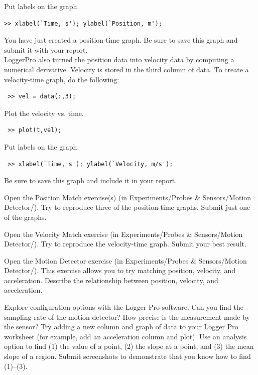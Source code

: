 \documentclass[11pt,letterpaper]{article}
\newcounter{question}[section]
\begin{document}
Put labels on the graph.
\begin{verbatim}>> xlabel(`Time, s'); ylabel(`Position, m');
\end{verbatim}

You have just created a position-time graph. Be sure to save this graph and submit it with your report.\\


LoggerPro also turned the position data into velocity data by computing a numerical derivative. Velocity is stored in the third column of data. To create a velocity-time graph, do the following:

\begin{verbatim} >> vel = data(:,3);\end{verbatim}

Plot the velocity vs. time.
\begin{verbatim} >> plot(t,vel);\end{verbatim}

Put labels on the graph.
\begin{verbatim} >> xlabel(`Time, s'); ylabel(`Velocity, m/s');
\end{verbatim}
Be sure to save this graph and include it in your report.

\question{} Open the Position Match exercise(s) (in Experiments/Probes \& Sensors/Motion Detector/). Try to reproduce three of the position-time graphs. Submit just one of the graphs.

\question{} Open the Velocity Match exercise (in Experiments/Probes \&
Sensors/Motion Detector/).  Try to reproduce the velocity-time graph. Submit your best result.

\question{} Open the Motion Detector exercise (in Experiments/Probes \& Sensors/Motion Detector/). This exercise allows you to try matching position, velocity, and acceleration. Describe the relationship between position, velocity, and acceleration.\vspace{6cm}


\question{} Explore configuration options with the Logger Pro software.
Can you find the sampling rate of the motion detector? How precise is the measurement made by the sensor? Try adding a new column and graph of data to your Logger Pro worksheet (for example, add an acceleration column and plot).  Use an analysis option
to find (1) the value of a point, (2) the slope at a point, and (3) the mean slope of a region. Submit screenshots to demonstrate that you know how to find (1)--(3).
\end{document}
